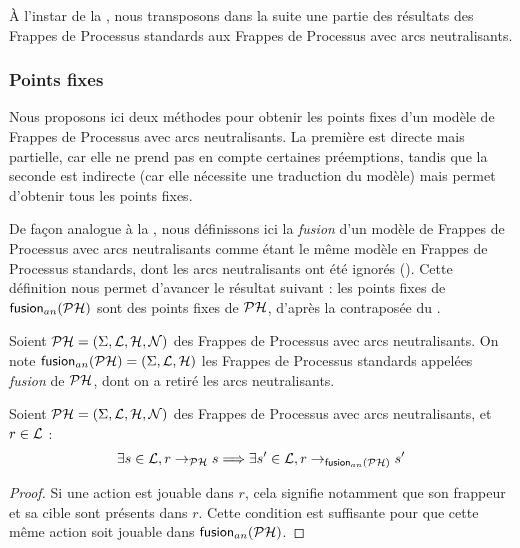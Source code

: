 À l'instar de la , nous transposons dans la suite une partie des résultats
des Frappes de Processus standards aux Frappes de Processus avec arcs neutralisants.

\subsubsection{Points fixes}

Nous proposons ici deux méthodes pour obtenir les points fixes d'un modèle de Frappes de Processus
avec arcs neutralisants.
La première est directe mais partielle, car elle ne prend pas en compte certaines préemptions,
tandis que la seconde est indirecte (car elle nécessite une traduction du modèle)
mais permet d'obtenir tous les points fixes.

\myskip

De façon analogue à la , nous définissons ici
la \emph{fusion} d'un modèle de Frappes de Processus avec arcs neutralisants
comme étant le même modèle en Frappes de Processus standards,
dont les arcs neutralisants ont été ignorés ().
Cette définition nous permet d'avancer le résultat suivant :
les points fixes de $\mathsf{fusion}_{an}(\mathcal{PH})$ sont des points fixes de $\mathcal{PH}$,
d'après la contraposée du .

\begin{definition}
  Soient $\mathcal{PH} = (\Sigma, \mathcal{L}, \mathcal{H}, \mathcal{N})$ des Frappes de Processus avec arcs neutralisants.
  On note $\mathsf{fusion}_{an}(\mathcal{PH}) = (\Sigma, \mathcal{L}, \mathcal{H})$
  les Frappes de Processus standards appelées \emph{fusion} de $\mathcal{PH}$,
  dont on a retiré les arcs neutralisants.
\end{definition}

\begin{theorem}
  Soient $\mathcal{PH} = (\Sigma, \mathcal{L}, \mathcal{H}, \mathcal{N})$ des Frappes de Processus avec arcs neutralisants,
  et $r \in \mathcal{L}$ :
  \[\exists s \in \mathcal{L}, r \rightarrow_{\mathcal{PH}} s \Longrightarrow
    \exists s' \in \mathcal{L}, r \rightarrow_{\mathsf{fusion}_{an}(\mathcal{PH})} s'\]
\end{theorem}

\begin{proof}
  Si une action est jouable dans $r$, cela signifie notamment
  que son frappeur et sa cible sont présents dans $r$.
  Cette condition est suffisante pour que cette même action soit jouable dans $\mathsf{fusion}_{an}(\mathcal{PH})$.
\end{proof}

